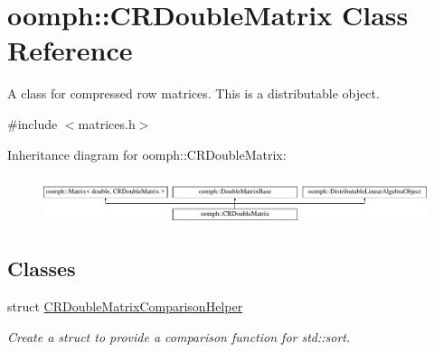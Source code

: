 \hypertarget{classoomph_1_1CRDoubleMatrix}{}\section{oomph\+:\+:C\+R\+Double\+Matrix Class Reference}
\label{classoomph_1_1CRDoubleMatrix}


A class for compressed row matrices. This is a distributable object.  




{\ttfamily \#include $<$matrices.\+h$>$}

Inheritance diagram for oomph\+:\+:C\+R\+Double\+Matrix\+:\begin{figure}[H]
\begin{center}
\leavevmode
\includegraphics[height=1.430396cm]{classoomph_1_1CRDoubleMatrix}
\end{center}
\end{figure}
\subsection*{Classes}
\begin{DoxyCompactItemize}
\item 
struct \hyperlink{structoomph_1_1CRDoubleMatrix_1_1CRDoubleMatrixComparisonHelper}{C\+R\+Double\+Matrix\+Comparison\+Helper}
\begin{DoxyCompactList}\small\item\em Create a struct to provide a comparison function for std\+::sort. \end{DoxyCompactList}\end{DoxyCompactItemize}
